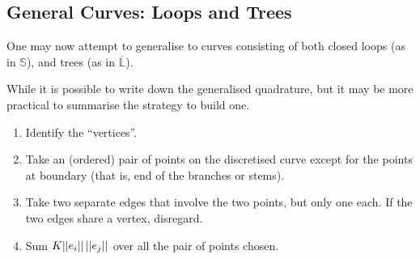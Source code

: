 \documentclass[../dissertation.tex]{subfiles}
\begin{document}
\subsection{General Curves: Loops and Trees}
One may now attempt to generalise to curves consisting of both closed loops (as in $\mathbb{S}$),
and trees (as in $\overline{\mathbb{L}}$).

While it is possible to write down the generalised quadrature,
but it may be more practical to summarise the strategy to build one.
\begin{enumerate}
    \item Identify the ``vertices''.
    \item Take an (ordered) pair of points on the discretised curve except for the points at boundary (that is, end of the branches or stems).
    \item Take two separate edges that involve the two points, but only one each.
        If the two edges share a vertex, disregard.
    \item Sum $K \lvert \lvert e_i \rvert \rvert \, \lvert \lvert e_j \rvert \rvert$ over all the pair of points chosen.
\end{enumerate}
\end{document}
